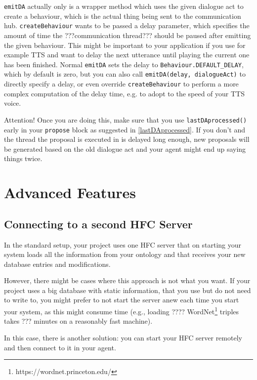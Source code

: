 \texttt{emitDA} actually only is a wrapper method which uses the given dialogue act to create a behaviour, which is the actual thing being sent to the communication hub. \texttt{createBehaviour} wants to be passed a delay parameter, which specifies the amount of time the ???communication thread??? should be paused after emitting the given behaviour. This might be important to your application if you use for example TTS and want to delay the next utterance until playing the current one has been finished.
Normal \texttt{emitDA} sets the delay to \texttt{Behaviour.DEFAULT\_DELAY}, which by default is zero, but you can also call \texttt{emitDA(delay, dialogueAct)} to directly specify a delay, or even override \texttt{createBehaviour} to perform a more complex computation of the delay time, e.g. to adopt to the speed of your TTS voice.

Attention! Once you are doing this, make sure that you use \texttt{lastDAprocessed()} early in your \texttt{propose} block as suggested in \ref{lastDAprocessed}. If you don't and the thread the proposal is executed in is delayed long enough, new proposals will be generated based on the old dialogue act and your agent might end up saying things twice.

\section{Advanced Features}

\subsection{Connecting to a second HFC Server}
In the standard setup, your \vonda project uses one HFC server that on starting your system loads all the information from your ontology and that receives your new database entries and modifications.

However, there might be cases where this approach is not what you want. If your project uses a big database with static information, that you use but do not need to write to, you might prefer to not start the server anew each time you start your system, as this might consume time (e.g., loading ???? WordNet\footnote{https://wordnet.princeton.edu/} triples takes ??? minutes on a reasonably fast machine).


In this case, there is another solution: you can start your HFC server remotely and then connect to it in your \vonda agent.


